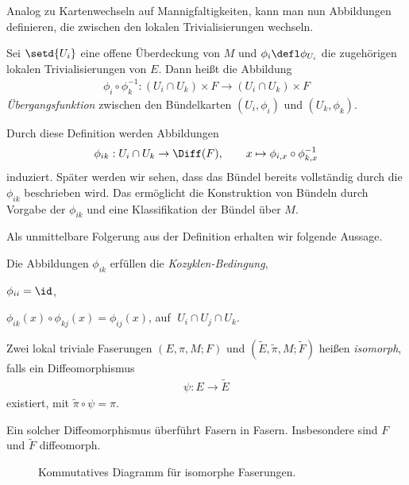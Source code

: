 \documentclass[%
	paper=a5,%
	fleqn,%
	DIV=18,%
	BCOR=0mm,
	fontsize=11pt,
	titlepage=false,%
	bibliography=totoc,
	DIV=18,%
	twoside=true,
	pdftitle=Riemannsche Geometrie,
	pdfauthor=Uwe Semmelmann,
	numbers=noendperiod]%
	{scrbook}
\begin{document}
Analog zu Kartenwechseln auf Mannigfaltigkeiten, kann man nun
Abbildungen definieren, die zwischen den lokalen Trivialisierungen wechseln.

\begin{defn}
Sei $\setd{U_i}$ eine offene Überdeckung von $M$ und $\phi_i\defl \phi_{U_i}$
die zugehörigen lokalen Trivialisierungen von $E$. Dann heißt die Abbildung
\begin{align*}
\phi_i\circ\phi_k^{-1} : (U_i\cap U_k)\times F\to (U_i\cap U_k)\times F
\end{align*}
\emph{Übergangsfunktion} zwischen den Bündelkarten $(U_i,\phi_i)$ und
$(U_k,\phi_k)$.\fish
\end{defn}


Durch diese Definition werden Abbildungen
\begin{align*}
\phi_{ik}: U_i\cap U_k\to \Diff(F),\qquad x\mapsto
\phi_{i,x}\circ\phi_{k,x}^{-1}
\end{align*}
induziert. Später werden wir sehen, dass das Bündel bereits vollständig durch
die $\phi_{ik}$ beschrieben wird. Das ermöglicht die Konstruktion von Bündeln
durch Vorgabe der $\phi_{ik}$ und eine Klassifikation der Bündel über $M$.

Als unmittelbare Folgerung aus der Definition erhalten wir folgende Aussage.

\begin{lem}
Die Abbildungen $\phi_{ik}$ erfüllen die \emph{Kozyklen-Bedingung},
\begin{propenum}
\item $\phi_{ii} = \id$,
\item $\phi_{ik}(x)\circ\phi_{kj}(x) = \phi_{ij}(x)$,\qquad
auf $ \;U_i\cap U_j\cap U_k$.\fish
\end{propenum}
\end{lem}


\begin{defn}
Zwei lokal triviale Faserungen $(E,\pi,M;F)$ und
$(\tilde{E},\tilde{\pi},M;\tilde{F})$ heißen \emph{isomorph}, falls ein
Diffeomorphismus
\begin{align*}
\psi: E\to \tilde{E}
\end{align*}
existiert, mit $\tilde{\pi}\circ\psi = \pi$.\fish
\end{defn}

Ein solcher Diffeomorphismus überführt Fasern in Fasern. Insbesondere sind $F$
und $\tilde{F}$ diffeomorph.

\begin{figure}
\centering
{}
\caption{Kommutatives Diagramm für isomorphe Faserungen.}
\end{figure}
\end{document}
